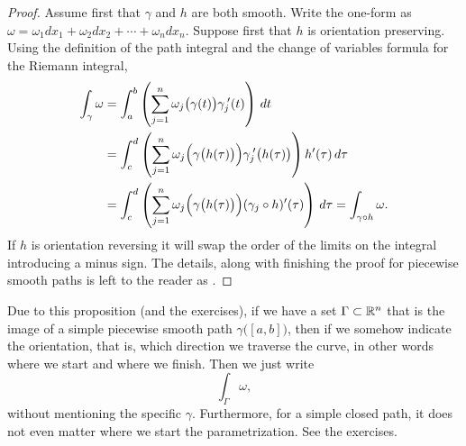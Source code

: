\begin{proof}
Assume first that $\gamma$ and $h$ are both smooth.
Write the one-form  as $\omega = \omega_1 dx_1 + \omega_2 dx_2 + \cdots +
\omega_n dx_n$.
Suppose first that $h$ is orientation preserving.  Using
the definition of the path integral and the change of variables
formula for the Riemann integral,
\begin{equation*}
\begin{split}
\int_{\gamma} \omega
& =
\int_a^b 
\left(
\sum_{j=1}^n
\omega_j\bigl(\gamma(t)\bigr) \gamma_j^{\:\prime}(t)
\right) \, dt
\\
& =
\int_c^d 
\left(
\sum_{j=1}^n
\omega_j\Bigl(\gamma\bigl(h(\tau)\bigr)\Bigr) \gamma_j^{\:\prime}\bigl(h(\tau)\bigr)
\right) h'(\tau) \, d\tau
\\
& =
\int_c^d 
\left(
\sum_{j=1}^n
\omega_j\Bigl(\gamma\bigl(h(\tau)\bigr)\Bigr) (\gamma_j \circ h)'(\tau)
\right) \, d\tau
=
\int_{\gamma \circ h} \omega .
\end{split}
\end{equation*}
If $h$ is orientation reversing it will swap the order of the limits on the
integral introducing a minus sign.  The details, along with finishing the proof for piecewise smooth
paths is left to the reader as .
\end{proof}

Due to this proposition (and the exercises), if we have a set $\Gamma
\subset {\mathbb{R}}^n$ that is the image of a simple piecewise smooth path
$\gamma\bigl([a,b]\bigr)$, then if we somehow indicate the orientation, that
is, which direction we traverse the curve, in other words where we start and
where we finish. Then we just write
\begin{equation*}
\int_{\Gamma} \omega ,
\end{equation*}
without mentioning the specific $\gamma$.
Furthermore, for a simple closed path, it does not even matter where we
start the parametrization.  See the exercises.

